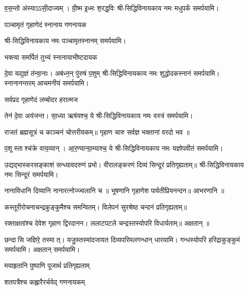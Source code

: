 \begin{center}
{व॒स॒न्तो अ॑स्याऽऽसी॒दाज्यम्। ग्री॒ष्म इ॒ध्मः श॒रद्ध॒विः}
श्री-सिद्धिविनायकाय नमः मधुपर्कं समर्पयामि।\medskip

{पञ्चामृतं गृहाणेदं स्नानाय गणनायक}

श्री-सिद्धिविनायकाय नमः पञ्चामृतस्नानम् समर्पयामि।\medskip

{भक्त्या समर्पितं तुभ्यं स्नानायाभीष्टदायक}

{दे॒वा यद्य॒ज्ञं त॑न्वा॒नाः। अब॑ध्न॒न् पु॑रुषं प॒शुम्}
श्री-सिद्धिविनायकाय नमः शुद्धोदकस्नानं समर्पयामि। स्नानानन्तरम् आचमनीयं समर्पयामि।\medskip

{सर्वप्रद गृहाणेदं लम्बोदर हरात्मज}

{तेन॑ दे॒वा अय॑जन्त। सा॒ध्या ऋष॑यश्च॒ ये}
श्री-सिद्धिविनायकाय नमः वस्त्रं समर्पयामि।\medskip

राजतं ब्रह्मसूत्रं च काञ्चनं चोत्तरीयकम्॥
गृहाण चारु सर्वज्ञ भक्तानां वरदो भव ॥

{प॒शूस्ताश्च॑क्रे वाय॒व्यान्। आ॒र॒ण्यान्ग्रा॒म्याश्च॒ ये}
श्री-सिद्धिविनायकाय नमः यज्ञोपवीतं समर्पयामि।\medskip

उद्यद्भास्करसङ्काशं सन्ध्यावदरुणं प्रभो।
वीरालङ्करणं दिव्यं सिन्दूरं प्रतिगृह्यताम्॥
श्री-सिद्धिविनायकाय नमः सिन्दूरं समर्पयामि।\medskip

नानाविधानि दिव्यानि नानारत्नोज्ज्वलानि च ॥ 
भूषणानि गृहाणेश पार्वतीप्रियनन्दन॥
आभरणानि ॥

कस्तूरीरोचनाचन्द्रकुङ्कुमैश्च समन्वितम्।
विलेपनं सुरश्रेष्ठ चन्दनं प्रतिगृह्यताम्॥

रक्ताक्षतांश्च देवेश गृहाण द्विरदानन।
ललाटपटले चन्द्रस्तस्योपरि विधार्यताम्॥
अक्षतान् ॥

{छन्दासि जज्ञिरे॒ तस्मात्। यजु॒स्तस्मा॑दजायत}
दिव्यपरिमलगन्धान् धारयामि। गन्धस्योपरि हरिद्राकुङ्कुमं समर्पयामि। अक्षतान् समर्पयामि।\medskip

{मयाहृतानि पुष्पाणि पूजार्थ प्रतिगृह्यताम्}

{शतपत्रैश्च कह्लारैरर्चयेद् गणनायकम्}


\end{center}
